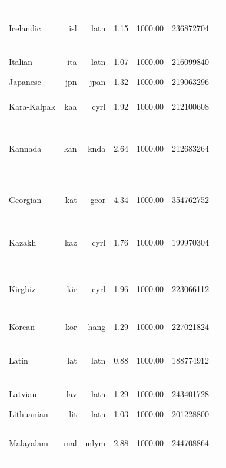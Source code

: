 \documentclass[11pt]{article}
\begin{document}
\begin{center}
\begin{longtable}[width=0.9\textwidth]{|lrrrrrl|}
Icelandic & isl & latn & 1.15 & 1000.00 & 236872704 & {\color{oscar}\rule{0.36cm}{8pt}}{\color{nllb}\rule{0.35cm}{8pt}}{\color{glot500}\rule{3.21cm}{8pt}}{\color{other}\rule{0.08000000000000007cm}{8pt}} \\ 
Italian & ita & latn & 1.07 & 1000.00 & 216099840 & {\color{oscar}\rule{4.0cm}{8pt}}{\color{other}\rule{0.0cm}{8pt}} \\ 
Japanese & jpn & jpan & 1.32 & 1000.00 & 219063296 & {\color{oscar}\rule{4.0cm}{8pt}}{\color{other}\rule{0.0cm}{8pt}} \\ 
Kara-Kalpak & kaa & cyrl & 1.92 & 1000.00 & 212100608 & {\color{madlad400}\rule{3.98cm}{8pt}}{\color{glot500}\rule{0.020000000000000018cm}{8pt}} \\ 
Kannada & kan & knda & 2.64 & 1000.00 & 212683264 & {\color{oscar}\rule{0.14cm}{8pt}}{\color{nllb}\rule{0.13cm}{8pt}}{\color{madlad400}\rule{1.63cm}{8pt}}{\color{glot500}\rule{1.97cm}{8pt}}{\color{other}\rule{0.1299999999999999cm}{8pt}} \\ 
Georgian & kat & geor & 4.34 & 1000.00 & 354762752 & {\color{oscar}\rule{0.98cm}{8pt}}{\color{nllb}\rule{0.3cm}{8pt}}{\color{madlad400}\rule{2.4cm}{8pt}}{\color{glot500}\rule{0.3200000000000003cm}{8pt}} \\ 
Kazakh & kaz & cyrl & 1.76 & 1000.00 & 199970304 & {\color{oscar}\rule{1.07cm}{8pt}}{\color{nllb}\rule{0.19cm}{8pt}}{\color{glot500}\rule{2.74cm}{8pt}} \\ 
Kirghiz & kir & cyrl & 1.96 & 1000.00 & 223066112 & {\color{oscar}\rule{0.33cm}{8pt}}{\color{nllb}\rule{0.54cm}{8pt}}{\color{madlad400}\rule{2.62cm}{8pt}}{\color{glot500}\rule{0.38cm}{8pt}}{\color{other}\rule{0.1299999999999999cm}{8pt}} \\ 
Korean & kor & hang & 1.29 & 1000.00 & 227021824 & {\color{oscar}\rule{4.0cm}{8pt}} \\ 
Latin & lat & latn & 0.88 & 1000.00 & 188774912 & {\color{oscar}\rule{0.02cm}{8pt}}{\color{madlad400}\rule{3.23cm}{8pt}}{\color{glot500}\rule{0.55cm}{8pt}}{\color{other}\rule{0.20000000000000018cm}{8pt}} \\ 
Latvian & lav & latn & 1.29 & 1000.00 & 243401728 & {\color{oscar}\rule{4.0cm}{8pt}} \\ 
Lithuanian & lit & latn & 1.03 & 1000.00 & 201228800 & {\color{oscar}\rule{4.0cm}{8pt}}{\color{other}\rule{0.0cm}{8pt}} \\ 
Malayalam & mal & mlym & 2.88 & 1000.00 & 244708864 & {\color{oscar}\rule{0.81cm}{8pt}}{\color{glot500}\rule{3.18cm}{8pt}}{\color{other}\rule{0.009999999999999787cm}{8pt}} \\ 

\end{longtable}
\end{center}
\end{document}
